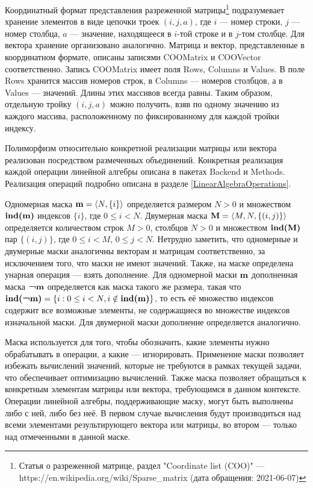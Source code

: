 \documentclass[14pt]{matmex-diploma-custom}
\begin{document}
Координатный формат представления разреженной матрицы\footnote{Статья о разреженной матрице, раздел "Coordinate list (COO)" --- https://en.wikipedia.org/wiki/Sparse\_matrix (дата обращения: 2021-06-07)} подразумевает хранение элементов в виде цепочки троек \((i,j,a)\), где \(i\) --- номер строки, \(j\) --- номер столбца, \(a\) --- значение, находящееся в \(i\)-той строке и в \(j\)-том столбце. Для вектора хранение организовано аналогично. Матрица и вектор, представленные в координатном формате, описаны записями COOMatrix и COOVector соответственно. Запись COOMatrix имеет поля Rows, Columns и Values. В поле Rows хранится массив номеров строк, в Columns --- номеров столбцов, а в Values --- значений. Длины этих массивов всегда равны. Таким образом, отдельную тройку \((i,j,a)\) можно получить, взяв по одному значению из каждого массива, расположенному по фиксированному для каждой тройки индексу.

Полиморфизм относительно конкретной реализации матрицы или вектора реализован посредством размеченных объединений. Конкретная реализация каждой операции линейной алгебры описана в пакетах Backend и Methods. Реализация операций подробно описана в разделе \ref{LinearAlgebraOperations}.

Одномерная маска \(\textnormal{\textbf{m}}=\langle{}N,\{i\}\rangle{}\) определяется размером \(N>0\) и множеством \(\textnormal{\textbf{ind(m)}}\) индексов \(\{i\}\), где \(0\leq{}i<N\). Двумерная маска \(\textnormal{\textbf{M}}=\langle{}M,N,\{(i,j)\}\rangle{}\) определяется количеством строк \(M>0\), столбцов \(N>0\) и множеством \(\textnormal{\textbf{ind(M)}}\) пар \(\{(i,j)\}\), где \(0\leq{}i<M\), \(0\leq{}j<N\). Нетрудно заметить, что одномерные и двумерные маски аналогичны векторам и матрицам соответственно, за исключением того, что маски не имеют значений. Также, на маске определена унарная операция --- взять дополнение. Для одномерной маски \(\textnormal{\textbf{m}}\) дополненная маска \(\textnormal{\textbf{\textlnot{}m}}\) определяется как маска такого же размера, такая что \(\textnormal{\textbf{ind(\textlnot{}m)}}=\{i:0\leq{}i<N,i\notin{}\textnormal{\textbf{ind(m)}}\}\), то есть её множество индексов содержит все возможные элементы, не содержащиеся во множестве индексов изначальной маски. Для двумерной маски дополнение определяется аналогично.

Маска используется для того, чтобы обозначить, какие элементы нужно обрабатывать в операции, а какие --- игнорировать. Применение маски позволяет избежать вычислений значений, которые не требуются в рамках текущей задачи, что обеспечивает оптимизацию вычислений. Также маска позволяет обращаться к конкретным элементам матрицы или вектора, требующимся в данном контексте. Операции линейной алгебры, поддерживающие маску, могут быть выполнены либо с ней, либо без неё. В первом случае вычисления будут производиться над всеми элементами результирующего вектора или матрицы, во втором --- только над отмеченными в данной маске.
\end{document}
